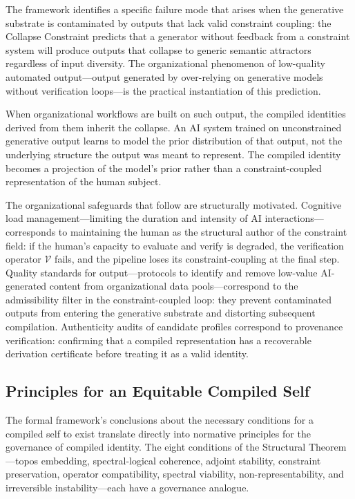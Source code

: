 \documentclass[12pt, a4paper]{article}
\theoremstyle{plain}
\theoremstyle{definition}
\theoremstyle{remark}
\begin{document}
The framework identifies a specific failure mode that arises when the generative substrate is contaminated by outputs that lack valid constraint coupling: the Collapse Constraint predicts that a generator without feedback from a constraint system will produce outputs that collapse to generic semantic attractors regardless of input diversity. The organizational phenomenon of low-quality automated output---output generated by over-relying on generative models without verification loops---is the practical instantiation of this prediction.

When organizational workflows are built on such output, the compiled identities derived from them inherit the collapse. An AI system trained on unconstrained generative output learns to model the prior distribution of that output, not the underlying structure the output was meant to represent. The compiled identity becomes a projection of the model's prior rather than a constraint-coupled representation of the human subject.

The organizational safeguards that follow are structurally motivated. Cognitive load management---limiting the duration and intensity of AI interactions---corresponds to maintaining the human as the structural author of the constraint field: if the human's capacity to evaluate and verify is degraded, the verification operator $\mathcal{V}$ fails, and the pipeline loses its constraint-coupling at the final step. Quality standards for output---protocols to identify and remove low-value AI-generated content from organizational data pools---correspond to the admissibility filter in the constraint-coupled loop: they prevent contaminated outputs from entering the generative substrate and distorting subsequent compilation. Authenticity audits of candidate profiles correspond to provenance verification: confirming that a compiled representation has a recoverable derivation certificate before treating it as a valid identity.

\subsection{Principles for an Equitable Compiled Self}

The formal framework's conclusions about the necessary conditions for a compiled self to exist translate directly into normative principles for the governance of compiled identity. The eight conditions of the Structural Theorem---topos embedding, spectral-logical coherence, adjoint stability, constraint preservation, operator compatibility, spectral viability, non-representability, and irreversible instability---each have a governance analogue.
\end{document}
